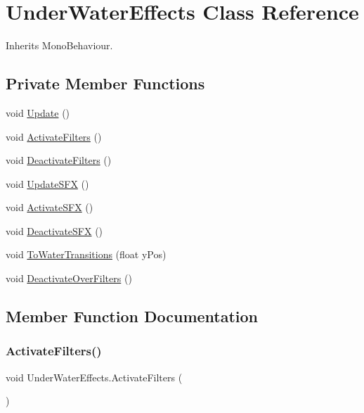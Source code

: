 \hypertarget{class_under_water_effects}{}\section{Under\+Water\+Effects Class Reference}
\label{class_under_water_effects}


Inherits Mono\+Behaviour.

\subsection*{Private Member Functions}
\begin{DoxyCompactItemize}
\item 
void \hyperlink{class_under_water_effects_a70c4037c51e8e2f19b728e3c2161aad9}{Update} ()
\item 
void \hyperlink{class_under_water_effects_a1ca1f63b1814fab4a2fd19a3838f4229}{Activate\+Filters} ()
\item 
void \hyperlink{class_under_water_effects_a13d2a38b1eec173fe62c3046d4243c76}{Deactivate\+Filters} ()
\item 
void \hyperlink{class_under_water_effects_a1bfea80ef5580028dfb091bf3199c5fc}{Update\+S\+FX} ()
\item 
void \hyperlink{class_under_water_effects_ab4178e1be88ef713aba66bf2e2a735bf}{Activate\+S\+FX} ()
\item 
void \hyperlink{class_under_water_effects_a1e852667cbb88ccc4ef0cc256035566e}{Deactivate\+S\+FX} ()
\item 
void \hyperlink{class_under_water_effects_a544e7334add9f85726fbcfa94e75828a}{To\+Water\+Transitions} (float y\+Pos)
\item 
void \hyperlink{class_under_water_effects_a2a6950ffe40bd98b615db076ba06744b}{Deactivate\+Over\+Filters} ()
\end{DoxyCompactItemize}


\subsection{Member Function Documentation}
\mbox{\label{class_under_water_effects_a1ca1f63b1814fab4a2fd19a3838f4229}} 
\subsubsection{\texorpdfstring{Activate\+Filters()}{ActivateFilters()}}
{\footnotesize\ttfamily void Under\+Water\+Effects.\+Activate\+Filters (\begin{DoxyParamCaption}{ }\end{DoxyParamCaption})\hspace{0.3cm}{\ttfamily [private]}}



